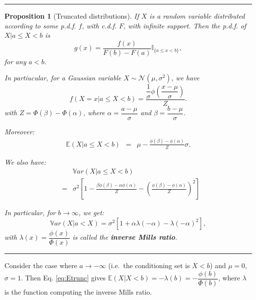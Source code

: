 \documentclass[
]{book}
\newtheorem{proposition}{Proposition}[chapter]
\theoremstyle{definition}
\theoremstyle{definition}
\theoremstyle{definition}
\theoremstyle{definition}
\theoremstyle{remark}
\begin{document}
\begin{center}\rule{0.5\linewidth}{0.5pt}\end{center}

\begin{proposition}[Truncated distributions]
\protect\hypertarget{prp:truncated}{}\label{prp:truncated}If \(X\) is a random variable distributed according to some p.d.f. \(f\), with c.d.f. \(F\), with infinite support. Then the p.d.f. of \(X|a \le X < b\) is
\[
g(x) = \frac{f(x)}{F(b)-F(a)}\mathbb{I}_{\{a \le x < b\}},
\]
for any \(a<b\).

In partiucular, for a Gaussian variable \(X \sim \mathcal{N}(\mu,\sigma^2)\), we have
\[
f(X=x|a\le X<b) = \dfrac{\dfrac{1}{\sigma}\phi\left(\dfrac{x - \mu}{\sigma}\right)}{Z}.
\]
with \(Z = \Phi(\beta)-\Phi(\alpha)\), where \(\alpha = \dfrac{a - \mu}{\sigma}\) and \(\beta = \dfrac{b - \mu}{\sigma}\).

Moreover:
\begin{eqnarray}
\mathbb{E}(X|a\le X<b) &=& \mu - \frac{\phi\left(\beta\right)-\phi\left(\alpha\right)}{Z}\sigma. \label{eq:Etrunc}
\end{eqnarray}

We also have:
\begin{eqnarray}
&& \mathbb{V}ar(X|a\le X<b) \nonumber\\
&=& \sigma^2\left[
1 -  \frac{\beta\phi\left(\beta\right)-\alpha\phi\left(\alpha\right)}{Z} -  \left(\frac{\phi\left(\beta\right)-\phi\left(\alpha\right)}{Z}\right)^2 \right] \label{eq:Vtrunc}
\end{eqnarray}

In particular, for \(b \rightarrow \infty\), we get:
\begin{equation}
\mathbb{V}ar(X|a < X) = \sigma^2\left[1 + \alpha\lambda(-\alpha) - \lambda(-\alpha)^2 \right], \label{eq:Vtrunc2}
\end{equation}
with \(\lambda(x)=\dfrac{\phi(x)}{\Phi(x)}\) is called the \textbf{inverse Mills ratio}.
\end{proposition}

\begin{center}\rule{0.5\linewidth}{0.5pt}\end{center}

Consider the case where \(a \rightarrow - \infty\) (i.e.~the conditioning set is \(X<b\)) and \(\mu=0\), \(\sigma=1\). Then Eq. \eqref{eq:Etrunc} gives \(\mathbb{E}(X|X<b) = - \lambda(b) = - \dfrac{\phi(b)}{\Phi(b)}\), where \(\lambda\) is the function computing the inverse Mills ratio.
\end{document}
